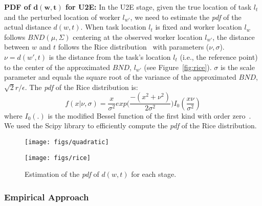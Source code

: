 \documentclass{USC-Thesis}
\numberwithin{equation}{chapter}
\begin{document}


\textbf{PDF of $\mathbf{d(w,t)}$ for U2E:} 
In the U2E stage, given the true location of task $l_t$ and the perturbed location of worker $l_{w'}$, we need to estimate the \emph{pdf} of the actual distance $d(w,t)$.
When task location $l_t$ is fixed and worker location $l_w$ follows $\mathit{BND(\mu,\Sigma)}$ centering at the observed worker location $l_{w'}$, the distance between $w$ and $t$ follows the Rice distribution~\cite{stuber2001principles} with parameters ($\nu,\sigma$). $\nu=d(w',t)$ is the distance from the task's location $l_t$ (i.e., the reference point) to the center of the approximated $\mathit{BND}$, $l_{w'}$ (see Figure~\ref{fig:rice}). $\sigma$ is the scale parameter and equals the square root of the variance of the approximated $\mathit{BND}$, $\sqrt{2}r/\epsilon$. The \emph{pdf} of the Rice distribution is:
$$f(x|\nu,\sigma)=\frac{x}{\sigma^2}exp\big(\frac{-(x^2+\nu^2)}{2\sigma^2}\big)I_0(\frac{x\nu}{\sigma^2})$$
where $I_0(.)$ is the modified Bessel function of the first kind with order zero~\cite{abramowitz1966handbook}.
We used the Scipy library to efficiently compute the \emph{pdf} of the Rice distribution.

\begin{figure}[ht]
	\begin{minipage}[b]{.45\linewidth}
		\centering
		\texttt{[image: figs/quadratic]}
		\label{fig:quadratic}
	\end{minipage}
	\vspace{10pt}
	\begin{minipage}[b]{.45\linewidth}
		\centering
		\texttt{[image: figs/rice]}
		\label{fig:rice}
	\end{minipage}
	\caption{Estimation of the \emph{pdf} of $d(w,t)$ for each stage.}
    \label{fig:reachability_estimation}
\end{figure}

\subsubsection{Empirical Approach}
\label{sec:empirical}
\end{document}
